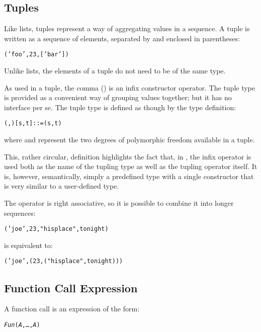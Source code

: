 \subsection{Tuples}
\label{expression:tuples}

Like lists, tuples represent a way of aggregating values in a sequence. A tuple is written as a sequence of elements, separated by \q{,} and enclosed in parentheses:
\begin{alltt}
\label{foo:bar:tuple}('foo',23,['bar'])
\end{alltt}
Unlike lists, the elements of a tuple do not need to be of the same type. 

As used in a tuple, the comma (\q{,}) is an infix constructor operator.  The tuple type is provided as a convenient way of grouping values together; but it has no interface per se. The tuple type is defined as though by the type definition:
\begin{alltt}
(,)[s,t] ::= (s,t)
\end{alltt}
where  and  represent the two degrees of polymorphic freedom available in a tuple.

This, rather circular, definition highlights the fact that, in \go, the \q{,} infix operator is used both as the name of the tupling type as well as the tupling operator itself. It is, however, semantically, simply a predefined type with a single constructor that is very similar to a user-defined type.

The \q{,} operator is right associative, so it is possible to combine it into longer sequences:
\begin{alltt}
('joe',23,"his place",tonight)
\end{alltt}
is equivalent to:
\begin{alltt}
('joe',(23,("his place",tonight)))
\end{alltt}

\subsection{Function Call Expression}
\label{expression:applicative}

A function call is an expression of the form:
\begin{alltt}
\emph{Fun}(\emph{A},\ldots,\emph{A\subn})
\end{alltt}

